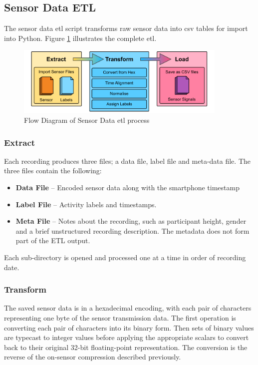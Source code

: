 \subsection{Sensor Data ETL}
\label{subsec:sensor-ETL}
The sensor data \acrshort{etl} script transforms raw sensor data into \acrshort{csv} tables for import into Python. Figure \ref{fig:methods_sensor_ETL} illustrates the complete \acrshort{etl}.

\begin{figure}[hbt]
    \centering
    \includegraphics[width=0.9\textwidth]{content/3-Methods/Sensor_ETL.pdf}
    \caption{Flow Diagram of Sensor Data \acrshort{etl} process}
    \label{fig:methods_sensor_ETL}
\end{figure}

\subsubsection{Extract} %
Each recording produces three files; a data file, label file and meta-data file. The three files contain the following:
\begin{itemize}
    \item \textbf{Data File} -- Encoded sensor data along with the smartphone timestamp
    \item \textbf{Label File} -- Activity labels and timestamps.
    \item \textbf{Meta File} -- Notes about the recording, such as participant height, gender and a brief unstructured recording description. The metadata does not form part of the ETL output.
\end{itemize}

Each sub-directory is opened and processed one at a time in order of recording date.

\subsubsection{Transform}
The saved sensor data is in a hexadecimal encoding, with each pair of characters representing one byte of the sensor transmission data. The first operation is converting each pair of characters into its binary form. Then sets of binary values are typecast to integer values before applying the appropriate scalars to convert back to their original 32-bit floating-point representation. The conversion is the reverse of the on-sensor compression described previously.

